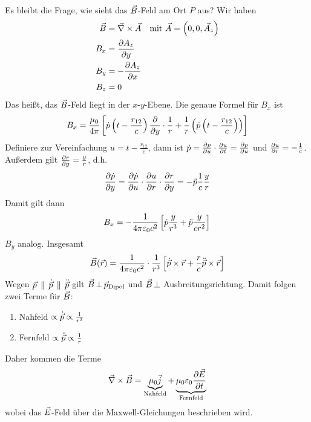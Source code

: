 Es bleibt die Frage, wie sieht das $\vecB$-Feld am Ort $P$ aus?
Wir haben
\begin{align*}
  \vecB &= \vecna\times\vecA 
  &\text{mit } \vecA = \left( 0,0,\vecA_z \right)\\
  B_x &= \dif[A_z]{y} \\
  B_y &= -\dif[A_z]{x}\\
  B_z &= 0
\end{align*}
Das heißt, das $\vecB$-Feld liegt in der $x$-$y$-Ebene.
Die genaue Formel für $B_x$ ist
\begin{gather*}
  B_x = \frac{\muo}{4\pi}\left[
    \dot{p}\left( t-\frac{r_{12}}{c} \right)\dif{y} \cdot \frac{1}{r}
    + \frac{1}{r}
    \left( 
      \dot{p}\left(t-\frac{r_{12}}{c}\right)
    \right)
  \right]
\end{gather*}
Definiere zur Vereinfachung $u=t-\frac{r_{12}}{c}$, dann ist
$\dot{p} = \dif[p]{u}\cdot\dif[u]{t} = \dif[p]{u}$
und $\dif[u]{r} = -\frac{1}{c}$.
Außerdem gilt $\dif[r]{y}=\frac{y}{r}$, d.h.
\begin{gather*}
  \dif[\dot{p}]{y} 
  = \dif[\dot{p}]{u}\cdot\dif[u]{r}\cdot\dif[r]{y}
  = -\ddot{p}\frac{1}{c}\frac{y}{r}
\end{gather*}
Damit gilt dann
\begin{gather*}
  B_x = -\frac{1}{4\pi\epso c^2}
  \left[ \dot{p}\frac{y}{r^3} 
    + \ddot{p} \frac{y}{cr^2} \right]
\end{gather*}
$B_y$ analog. Insgesamt
\begin{gather*}
  \vecB(\vecr) = \frac{1}{4\pi\epso c^2}\cdot
  \frac{1}{r^3}
  \left[ 
    \dot{\vecp}\times\vecr 
    + \frac{r}{c}\ddot{\vecp}\times\vecr
  \right]
\end{gather*}
Wegen $\vecp\,\parallel\,\dot{\vecp}\,\parallel\,\ddot{\vecp}$
gilt $\vecB\,\bot\,\vecp_{\text{Dipol}}$ und
$\vecB\,\bot$ Ausbreitungsrichtung.
Damit folgen zwei Terme für $\vecB$:
\begin{enumerate}
\item Nahfeld $\propto \dot\vecp \propto \frac{1}{r^2}$
\item Fernfeld $\propto \ddot\vecp \propto \frac{1}{r}$
\end{enumerate}
Daher kommen die Terme
\begin{gather*}
  \vecna \times \vecB 
  = \underbrace{\mu_0\vecj}_{\text{Nahfeld}}
  + \underbrace{\muo\epso \dif[\vecE]{t}}_{\text{Fernfeld}}
\end{gather*}
wobei das $\vecE$-Feld über die Maxwell-Gleichungen beschrieben wird.

